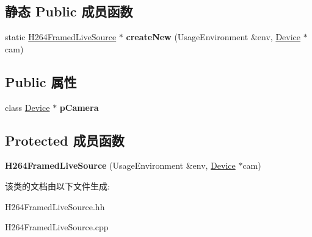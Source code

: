 \subsection*{静态 Public 成员函数}
\begin{DoxyCompactItemize}
\item 
\mbox{\label{class_h264_framed_live_source_a7c250dedd272ffc55b30c42e279228df}} 
static \hyperlink{class_h264_framed_live_source}{H264\+Framed\+Live\+Source} $\ast$ {\bfseries create\+New} (Usage\+Environment \&env, \hyperlink{class_device}{Device} $\ast$cam)
\end{DoxyCompactItemize}
\subsection*{Public 属性}
\begin{DoxyCompactItemize}
\item 
\mbox{\label{class_h264_framed_live_source_a53b90d637797e98658148f524ac6499a}} 
class \hyperlink{class_device}{Device} $\ast$ {\bfseries p\+Camera}
\end{DoxyCompactItemize}
\subsection*{Protected 成员函数}
\begin{DoxyCompactItemize}
\item 
\mbox{\label{class_h264_framed_live_source_afa33f8eb70b444565e68fdafa09ae43f}} 
{\bfseries H264\+Framed\+Live\+Source} (Usage\+Environment \&env, \hyperlink{class_device}{Device} $\ast$cam)
\end{DoxyCompactItemize}


该类的文档由以下文件生成\+:\begin{DoxyCompactItemize}
\item 
H264\+Framed\+Live\+Source.\+hh\item 
H264\+Framed\+Live\+Source.\+cpp\end{DoxyCompactItemize}
